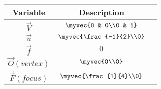 \begin{center}
    \begin{tabular}{|c|c|c|} 
        \hline
            \textbf{Variable} & \textbf{Description}\\ 
        \hline
            $\vec{V}$   & $\myvec{0 & 0\\0 & 1}$ \\ 
        \hline
            $\vec{u}$   & $\myvec{\frac{-1}{2}\\0}$\\ 
        \hline
            $\vec{f}$   & $0$\\
        \hline
            $\vec{O}(vertex)$   & $\myvec{0\\0}$\\
        \hline
            $\vec{F}(focus)$   & $\myvec{\frac{1}{4}\\0}$\\
        \hline
    \end{tabular}
\end{center}